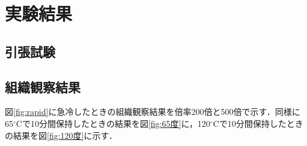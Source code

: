 \section{実験結果}

\subsection{引張試験}

\subsection{組織観察結果}
図\ref{fig:rapid}に急冷したときの組織観察結果を倍率200倍と500倍で示す．同様に65$^\circ$Cで10分間保持したときの結果を図\ref{fig:65度}に，120$^\circ$Cで10分間保持したときの結果を図\ref{fig:120度}に示す．

